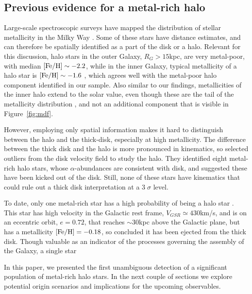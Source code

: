 \documentclass[apj, twocolappendix, numberedappendix, appendixfloats]{emulateapj}
\begin{document}
\subsection{Previous evidence for a metal-rich halo}
\label{sec:previous}
Large-scale spectroscopic surveys have mapped the distribution of stellar metallicity in the Milky Way \citep[e.g.,][]{ivezic2008}.
Some of these stars have distance estimates, and can therefore be spatially identified as a part of the disk or a halo.
Relevant for this discussion, halo stars in the outer Galaxy, $R_{G}>15$\;kpc, are very metal-poor, with median $\rm[Fe/H]\sim-2.2$, while in the inner Galaxy, typical metallicity of a halo star is $\rm[Fe/H]\sim-1.6$ \citep[e.g.,][]{carollo2007, dejong2010}, which agrees well with the metal-poor halo component identified in our sample.
Also similar to our findings, metallicities of the inner halo extend to the solar value, even though these are the tail of the metallicity distribution \citep[e.g.,][]{allendeprieto2006}, and not an additional component that is visible in Figure~\ref{fig:mdf}.

However, employing only spatial information makes it hard to distinguish between the halo and the thick-disk, especially at high metallicity.
The difference between the thick disk and the halo is more pronounced in kinematics, so \citet{sheffield2012} selected outliers from the disk velocity field to study the halo.
They identified eight metal-rich halo stars, whose $\alpha$-abundances are consistent with disk, and suggested these have been kicked out of the disk.
Still, none of these stars have kinematics that could rule out a thick disk interpretation at a $3\;\sigma$ level.

To date, only one metal-rich star has a high probability of being a halo star \citep{hawkins2015}.
This star has high velocity in the Galactic rest frame, $V_{GSR}\simeq430$\;km/s, and is on an eccentric orbit, $e=0.72$, that reaches $\sim30$\;kpc above the Galactic plane, but has a metallicity $\rm[Fe/H]=-0.18$, so \citet{hawkins2015} concluded it has been ejected from the thick disk.
Though valuable as an indicator of the processes governing the assembly of the Galaxy, a single star 

In this paper, we presented the first unambiguous detection of a significant population of metal-rich halo stars.
In the next couple of sections we explore potential origin scenarios and implications for the upcoming observables.
\end{document}
